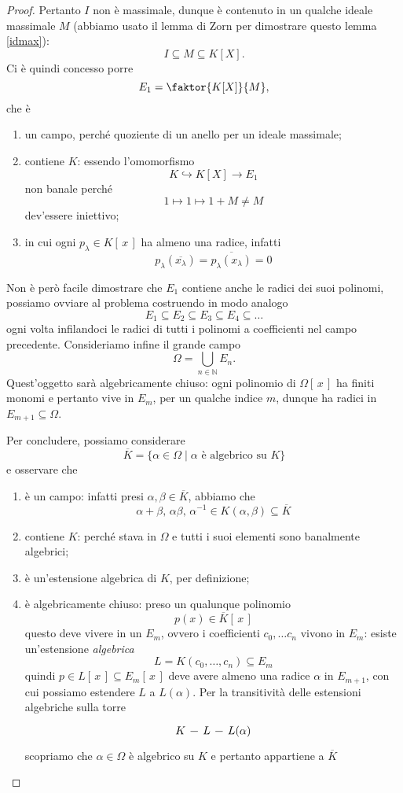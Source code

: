 \begin{multicols}{2}
\begin{proof}
	Pertanto $ I $ non è massimale, dunque è contenuto in un qualche ideale massimale $ M $ (abbiamo usato il lemma di Zorn per dimostrare questo lemma \ref{idmax}):
	\[ I \subseteq M \subseteq K[X]. \]
	Ci è quindi concesso porre
	\[ E_1 = \faktor{K[X]}{M}, \]
	che è
	\begin{enumerate}
		\item un campo, perché quoziente di un anello per un ideale massimale;
		\item contiene $ K $: essendo l'omomorfismo
		\[ K \hookrightarrow K[X] \to E_1 \]
		non banale perché
		\[ 1 \mapsto 1 \mapsto 1 + M \neq M \]
		dev'essere iniettivo;
		\item in cui ogni $ p_\lambda \in K[\,x\,] $ ha almeno una radice, infatti
		\[ p_\lambda(\overline{x_\lambda}) = \overline{p_\lambda(x_\lambda)} = 0 \]
	\end{enumerate}
	
	Non è però facile dimostrare che $ E_1 $ contiene anche le radici dei suoi polinomi, possiamo ovviare al problema costruendo in modo analogo $$ E_1 \subseteq E_2 \subseteq E_3 \subseteq E_4 \subseteq \dots  $$
	ogni volta infilandoci le radici di tutti i polinomi a coefficienti nel campo precedente. Consideriamo infine il grande campo
	\[ \Omega = \bigcup_{n \in \mathbb{N}} E_n. \]
	Quest'oggetto sarà algebricamente chiuso: ogni polinomio di $ \Omega[\,x\,] $ ha finiti monomi e pertanto vive in $ E_{m} $, per un qualche indice $ m $, dunque ha radici in $ E_{m+1} \subseteq \Omega $.
	
	Per concludere, possiamo considerare 
	\[ \overline{K} = \{ \alpha \in \Omega \mid \alpha \text{ è algebrico su } K \} \]
	e osservare che
	\begin{enumerate}
		\item è un campo: infatti presi $ \alpha, \beta \in \overline{K} $, abbiamo che
		\[ \alpha + \beta,\, \alpha\beta, \, \alpha^{-1} \in K(\alpha, \beta) \subseteq \overline{K} \]
		\item contiene $ K $: perché stava in $ \Omega $ e tutti i suoi elementi sono banalmente algebrici;
		\item è un'estensione algebrica di $ K $, per definizione;
		\item è algebricamente chiuso: preso un qualunque polinomio
		\[ p(x) \in \overline{K}[\, x \,] \]
		questo deve vivere in un $ E_m $, ovvero i coefficienti $ c_0, \dots c_n $ vivono in $ E_m $: esiste un'estensione \emph{algebrica}
		\[ L = K(c_0, \dots, c_n) \subseteq E_m  \]
		quindi $ p \in L[\,x\,] \subseteq E_m[\,x\,]  $ deve avere almeno una radice $ \alpha $ in $ E_{m+1} $, con cui possiamo estendere $ L $ a $ L(\alpha) $. Per la transitività delle estensioni algebriche sulla torre
		\[\begin{tikzcd}[column sep=0.25cm]
		K \arrow [r,-] &
		L \arrow [r,-] &
		L(\alpha)
		\end{tikzcd} \]
		scopriamo che $ \alpha \in \Omega $ è algebrico su $ K $ e pertanto appartiene a $ \overline{K} $
		

\end{enumerate}
\end{proof}
\end{multicols}
